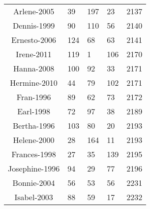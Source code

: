 \begin{table}[ht]
\begin{tabular}{cp{3cm}p{3cm}p{3cm}p{3cm}}
  Arlene-2005 &  39 & 197 &  23 & 2137 \\ 
  Dennis-1999 &  90 & 110 &  56 & 2140 \\ 
  Ernesto-2006 & 124 &  68 &  63 & 2141 \\ 
  Irene-2011 & 119 &   1 & 106 & 2170 \\ 
  Hanna-2008 & 100 &  92 &  33 & 2171 \\ 
  Hermine-2010 &  44 &  79 & 102 & 2171 \\ 
  Fran-1996 &  89 &  62 &  73 & 2172 \\ 
  Earl-1998 &  72 &  97 &  38 & 2189 \\ 
  Bertha-1996 & 103 &  80 &  20 & 2193 \\ 
  Helene-2000 &  28 & 164 &  11 & 2193 \\ 
  Frances-1998 &  27 &  35 & 139 & 2195 \\ 
  Josephine-1996 &  94 &  29 &  77 & 2196 \\ 
  Bonnie-2004 &  56 &  53 &  56 & 2231 \\ 
  Isabel-2003 &  88 &  59 &  17 & 2232 \\ 
   \bottomrule
\end{tabular}
\end{table}
